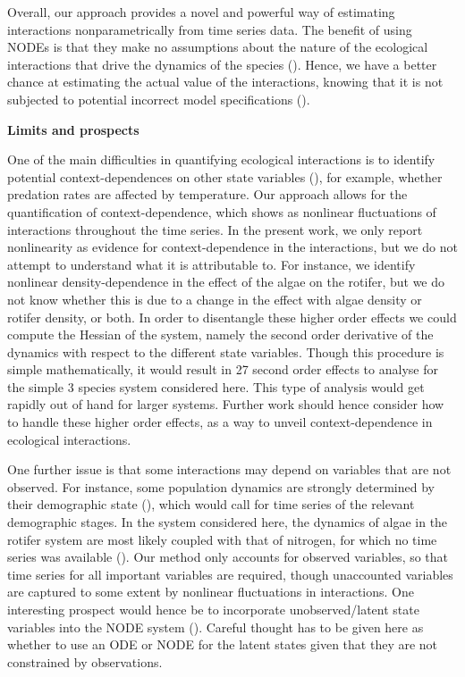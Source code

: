 \documentclass[11pt, oneside]{article}
\begin{document}
Overall, our approach provides a novel and powerful way of estimating interactions nonparametrically from time series data.
The benefit of using NODEs is that they make no assumptions about the nature of the ecological interactions that drive the dynamics of the species (\cite{Chen2018,Bonnaffe2021a}). 
Hence, we have a better chance at estimating the actual value of the interactions, knowing that it is not subjected to potential incorrect model specifications (\cite{Jost2000,Ellner2002,Wu2005,Kendall2005,Adamson2013}).

\textbf{Limits and prospects}

One of the main difficulties in quantifying ecological interactions is to identify potential context-dependences on other state variables (\cite{Song2021}), for example, whether predation rates are affected by temperature.
Our approach allows for the quantification of context-dependence, which shows as nonlinear fluctuations of interactions throughout the time series.
In the present work, we only report nonlinearity as evidence for context-dependence in the interactions, but we do not attempt to understand what it is attributable to.
For instance, we identify nonlinear density-dependence in the effect of the algae on the rotifer, but we do not know whether this is due to a change in the effect with algae density or rotifer density, or both. 
In order to disentangle these higher order effects we could compute the Hessian of the system, namely the second order derivative of the dynamics with respect to the different state variables. 
Though this procedure is simple mathematically, it would result in 27 second order effects to analyse for the simple 3 species system considered here.
This type of analysis would get rapidly out of hand for larger systems.
Further work should hence consider how to handle these higher order effects, as a way to unveil context-dependence in ecological interactions. 

One further issue is that some interactions may depend on variables that are not observed.
For instance, some population dynamics are strongly determined by their demographic state (\cite{Lande2002,Coulson2004}), which would call for time series of the relevant demographic stages.
In the system considered here, the dynamics of algae in the rotifer system are most likely coupled with that of nitrogen, for which no time series was available (\cite{Hiltunen2013}).
Our method only accounts for observed variables, so that time series for all important variables are required, though unaccounted variables are captured to some extent by nonlinear fluctuations in interactions.
One interesting prospect would hence be to incorporate unobserved/latent state variables into the NODE system (\cite{Dupont2019,Zhang2019,Frank2022}).
Careful thought has to be given here as whether to use an ODE or NODE for the latent states given that they are not constrained by observations. 
\end{document}
